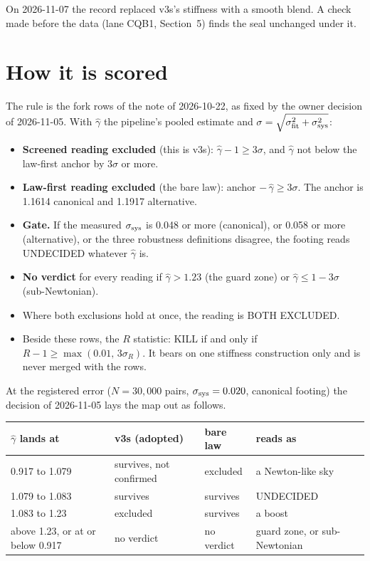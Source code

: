 \documentclass[10pt]{article}
\begin{document}
On 2026-11-07 the record replaced v3s's stiffness with a smooth blend. A check made before the data (lane CQB1, Section~5) finds the seal unchanged under it.

\section{How it is scored}
The rule is the fork rows of the note of 2026-10-22, as fixed by the owner decision of 2026-11-05. With $\hat\gamma$ the pipeline's pooled estimate and $\sigma=\sqrt{\sigma_{\rm fit}^2+\sigma_{\rm sys}^2}$:
\begin{itemize}
\item \textbf{Screened reading excluded} (this is v3s): $\hat\gamma-1\ge3\sigma$, and $\hat\gamma$ not below the law-first anchor by $3\sigma$ or more.
\item \textbf{Law-first reading excluded} (the bare law): anchor $-\,\hat\gamma\ge3\sigma$. The anchor is 1.1614 canonical and 1.1917 alternative.
\item \textbf{Gate.} If the measured $\sigma_{\rm sys}$ is 0.048 or more (canonical), or 0.058 or more (alternative), or the three robustness definitions disagree, the footing reads UNDECIDED whatever $\hat\gamma$ is.
\item \textbf{No verdict} for every reading if $\hat\gamma>1.23$ (the guard zone) or $\hat\gamma\le1-3\sigma$ (sub-Newtonian).
\item Where both exclusions hold at once, the reading is BOTH EXCLUDED.
\item Beside these rows, the $R$ statistic: KILL if and only if $R-1\ge\max(0.01,\,3\sigma_R)$. It bears on one stiffness construction only and is never merged with the rows.
\end{itemize}
At the registered error ($N=30{,}000$ pairs, $\sigma_{\rm sys}=0.020$, canonical footing) the decision of 2026-11-05 lays the map out as follows.

\begin{center}\begin{tabular}{llll}
\toprule
$\hat\gamma$ lands at & v3s (adopted) & bare law & reads as\\
\midrule
0.917 to 1.079 & survives, not confirmed & excluded & a Newton-like sky\\
1.079 to 1.083 & survives & survives & UNDECIDED\\
1.083 to 1.23 & excluded & survives & a boost\\
above 1.23, or at or below 0.917 & no verdict & no verdict & guard zone, or sub-Newtonian\\
\bottomrule
\end{tabular}\end{center}
\end{document}
